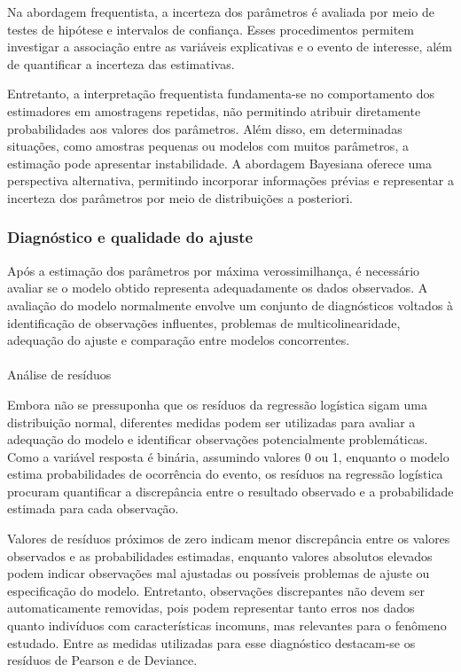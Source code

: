 \documentclass[
  brazilian,
  12pt,
  letterpaper,
  DIV=11,
  numbers=noendperiod]{scrartcl}
\makeatletter
\let\oldparagraph\paragraph
\renewcommand{\paragraph}{
    \@ifstar
      \xxxParagraphStar
      \xxxParagraphNoStar
  }
\newcommand{\xxxParagraphStar}[1]{\oldparagraph*{#1}\mbox{}}
\newcommand{\xxxParagraphNoStar}[1]{\oldparagraph{#1}\mbox{}}
\makeatother
\begin{document}
Na abordagem frequentista, a incerteza dos parâmetros é avaliada por
meio de testes de hipótese e intervalos de confiança. Esses
procedimentos permitem investigar a associação entre as variáveis
explicativas e o evento de interesse, além de quantificar a incerteza
das estimativas.

Entretanto, a interpretação frequentista fundamenta-se no comportamento
dos estimadores em amostragens repetidas, não permitindo atribuir
diretamente probabilidades aos valores dos parâmetros. Além disso, em
determinadas situações, como amostras pequenas ou modelos com muitos
parâmetros, a estimação pode apresentar instabilidade. A abordagem
Bayesiana oferece uma perspectiva alternativa, permitindo incorporar
informações prévias e representar a incerteza dos parâmetros por meio de
distribuições a posteriori.

\subsubsection{Diagnóstico e qualidade do
ajuste}\label{diagnuxf3stico-e-qualidade-do-ajuste}

Após a estimação dos parâmetros por máxima verossimilhança, é necessário
avaliar se o modelo obtido representa adequadamente os dados observados.
A avaliação do modelo normalmente envolve um conjunto de diagnósticos
voltados à identificação de observações influentes, problemas de
multicolinearidade, adequação do ajuste e comparação entre modelos
concorrentes.

\paragraph{Análise de resíduos}\label{anuxe1lise-de-resuxedduos}

Embora não se pressuponha que os resíduos da regressão logística sigam
uma distribuição normal, diferentes medidas podem ser utilizadas para
avaliar a adequação do modelo e identificar observações potencialmente
problemáticas. Como a variável resposta é binária, assumindo valores 0
ou 1, enquanto o modelo estima probabilidades de ocorrência do evento,
os resíduos na regressão logística procuram quantificar a discrepância
entre o resultado observado e a probabilidade estimada para cada
observação.

Valores de resíduos próximos de zero indicam menor discrepância entre os
valores observados e as probabilidades estimadas, enquanto valores
absolutos elevados podem indicar observações mal ajustadas ou possíveis
problemas de ajuste ou especificação do modelo. Entretanto, observações
discrepantes não devem ser automaticamente removidas, pois podem
representar tanto erros nos dados quanto indivíduos com características
incomuns, mas relevantes para o fenômeno estudado. Entre as medidas
utilizadas para esse diagnóstico destacam-se os resíduos de Pearson e de
Deviance.
\end{document}
